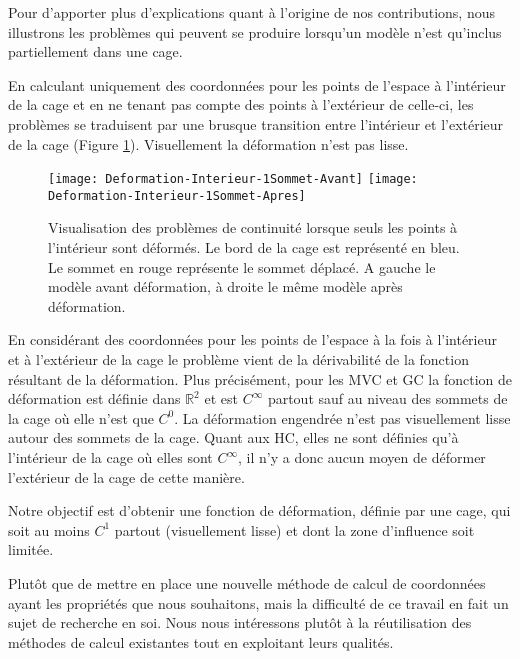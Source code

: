 Pour d'apporter plus d'explications quant à l'origine de nos contributions,
nous illustrons les problèmes qui peuvent se produire lorsqu'un modèle n'est
qu'inclus partiellement dans une cage.

En calculant uniquement des coordonnées pour les points de l'espace à
l'intérieur de la cage et en ne tenant pas compte des points à l'extérieur de
celle-ci, les problèmes se traduisent par une brusque transition entre
l'intérieur et l'extérieur de la cage (Figure \ref{MELVI}). Visuellement la
déformation n'est pas lisse.

\begin{figure}[ht]
  \begin{center}
    \scalebox{0.2}
    {
      \texttt{[image: Deformation-Interieur-1Sommet-Avant]}
      \texttt{[image: Deformation-Interieur-1Sommet-Apres]}
    }

    \caption[Problème de continuité déformation naïve] {Visualisation des
problèmes de continuité lorsque seuls les points à l'intérieur sont déformés.
Le bord de la cage est représenté en bleu. Le sommet en rouge représente le
sommet déplacé. A gauche le modèle avant déformation, à droite le même modèle
après déformation.}

    \label{MELVI}
  \end{center}
\end{figure}

En considérant des coordonnées pour les points de l'espace à la fois à
l'intérieur et à l'extérieur de la cage le problème vient de la dérivabilité
de la fonction résultant de la déformation. Plus précisément, pour les MVC et
GC la fonction de déformation est définie dans $\mathbb{R}^2$ et est
$C^{\infty}$ partout sauf au niveau des sommets de la cage où elle n'est que
$C^0$. La déformation engendrée n'est pas visuellement lisse autour des
sommets de la cage. Quant aux HC, elles ne sont définies qu'à l'intérieur de
la cage où elles sont $C^{\infty}$, il n'y a donc aucun moyen de déformer
l'extérieur de la cage de cette manière.

Notre objectif est d'obtenir une fonction de déformation, définie par une
cage, qui soit au moins $C^1$ partout (visuellement lisse) et dont la zone
d'influence soit limitée.

Plutôt que de mettre en place une nouvelle méthode de calcul de coordonnées
ayant les propriétés que nous souhaitons, mais la difficulté de ce travail en
fait un sujet de recherche en soi. Nous nous intéressons plutôt à la
réutilisation des méthodes de calcul existantes tout en exploitant leurs
qualités.

